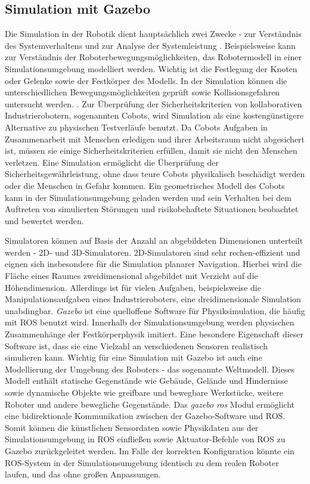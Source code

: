 \subsection{Simulation mit Gazebo}
Die Simulation in der Robotik dient hauptsächlich zwei Zwecke - zur Verständnis des Systemverhaltens und zur Analyse der Systemleistung \autocite[110]{DatteriSchiaffonati2019}. Beispielsweise kann zur Verständnis der Roboterbewegungsmöglichkeiten, das Robotermodell in einer Simulationsumgebung modelliert werden. Wichtig ist die Festlegung der Knoten oder Gelenke sowie der Festkörper des Modells. In der Simulation können die unterschiedlichen Bewegungsmöglichkeiten geprüft sowie Kollisionsgefahren untersucht werden. \autocite[11]{LentinMasteringROS2018}. Zur Überprüfung der Sicherheitskriterien von kollaborativen Industrierobotern, sogenannten Cobots, wird Simulation als eine kostengünstigere Alternative zu physischen Testverläufe benutzt. Da Cobots Aufgaben in Zusammenarbeit mit Menschen erledigen und ihrer Arbeitsraum nicht abgesichert ist, müssen sie einige Sicherheitskriterien erfüllen, damit sie nicht den Menschen verletzen. Eine Simulation ermöglicht die Überprüfung der Sicherheitsgewährleistung, ohne dass teure Cobots physikalisch beschädigt werden oder die Menschen in Gefahr kommen. Ein geometrisches Modell des Cobots kann in der Simulationsumgebung geladen werden und sein Verhalten bei dem Auftreten von simulierten Störungen und risikobehaftete Situationen beobachtet und bewertet werden. \autocite{ore_vemula_hanson_wiktorsson_fagerström_2019}

Simulatoren können auf Basis der Anzahl an abgebildeten Dimensionen unterteilt werden - 2D- und 3D-Simulatoren. 2D-Simulatoren sind sehr rechen-effizient und eignen sich insbesondere für die Simulation planarer Navigation. Hierbei wird die Fläche eines Raumes zweidimensional abgebildet mit Verzicht auf die Höhendimension. Allerdings ist für vielen Aufgaben, beispielsweise die Manipulationsaufgaben eines Industrieroboters, eine dreidimensionale  Simulation unabdingbar. \emph{Gazebo} ist eine quelloffene Software für Physiksimulation, die häufig mit ROS benutzt wird. Innerhalb der Simulationsumgebung werden physischen Zusammenhänge der Festkörperphysik imitiert. Eine besondere Eigenschaft dieser Software ist, dass sie eine Vielzahl an verschiedenen Sensoren realistisch simulieren kann. Wichtig für eine Simulation mit Gazebo ist auch eine Modellierung der Umgebung des Roboters - das sogenannte Weltmodell. Dieses Modell enthält statische Gegenstände wie Gebäude, Gelände und Hindernisse sowie dynamische Objekte wie greifbare und bewegbare Werkstücke, weitere Roboter und andere bewegliche Gegenstände. Das \emph{gazebo \textunderscore ros} Modul ermöglicht eine bidirektionale Kommunikation zwischen der Gazebo-Software und ROS. Somit können die künstlichen Sensordaten sowie Physikdaten aus der Simulationsumgebung in ROS einfließen sowie Aktuator-Befehle von ROS zu Gazebo zurückgeleitet werden. Im Falle der korrekten Konfiguration könnte ein ROS-System in der Simulationsumgebung identisch zu dem realen Roboter laufen, und das ohne großen Anpassungen. \autocite[95-96]{QuigleyROS2015} \autocite[114]{NewmanWyattS2018ASAt}

